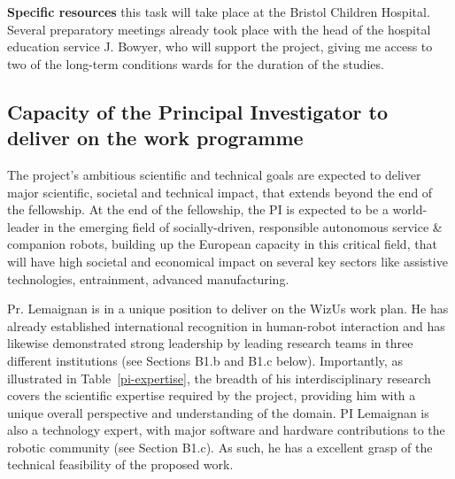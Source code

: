 \documentclass[11pt,a4paper]{report}
\newcommand{\project}{WizUs\xspace}
\begin{document}
\textbf{Specific resources} this task will take place at the Bristol Children
Hospital. Several preparatory meetings already took place with the head of the
hospital education service J. Bowyer, who will support the project, giving me
access to two of the long-term conditions wards for the duration of the studies.


\subsection{Capacity of the Principal Investigator to deliver on the work programme}

The project's ambitious scientific and technical goals are expected to deliver
major scientific, societal and technical impact, that extends beyond the end of
the fellowship. At the end of the fellowship, the PI is expected to be a
world-leader in the emerging field of socially-driven, responsible autonomous
service \& companion robots, building up the European capacity in this critical
field, that will have high societal and economical impact on several key sectors
like assistive technologies, entrainment, advanced manufacturing.

Pr. Lemaignan is in a unique position to deliver on the \project work plan.  He
has already established international recognition in human-robot interaction and
has likewise demonstrated strong leadership by leading research teams in three
different institutions (see Sections B1.b and B1.c below). Importantly, as
illustrated in Table~\ref{pi-expertise}, the breadth of
his interdisciplinary research covers the scientific expertise required by the
project, providing him with a unique overall perspective and understanding of
the domain. PI Lemaignan is also a technology expert, with major software and
hardware contributions to the robotic community (see Section B1.c). As such, he
has a excellent grasp of the technical feasibility of the proposed work.
\end{document}
